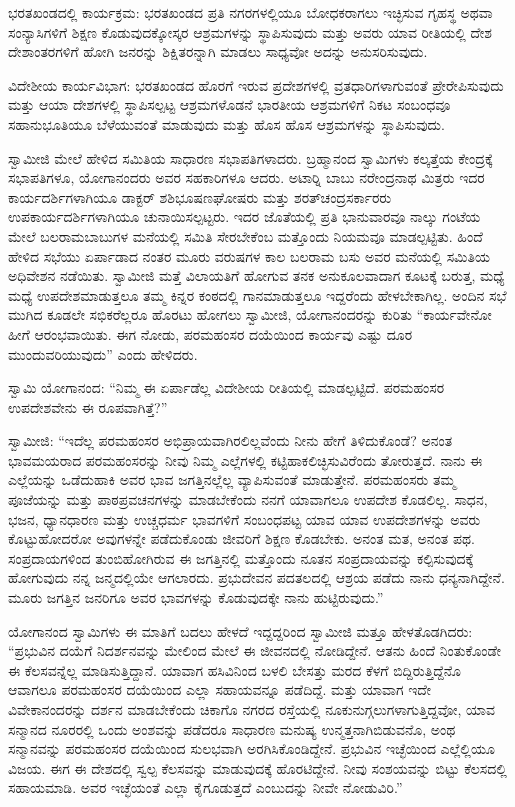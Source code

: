  ಭರತಖಂಡದಲ್ಲಿ ಕಾರ್ಯಕ್ರಮ: ಭರತಖಂಡದ ಪ್ರತಿ ನಗರಗಳಲ್ಲಿಯೂ ಬೋಧಕರಾಗಲು ಇಚ್ಛಿಸುವ ಗೃಹಸ್ಥ ಅಥವಾ ಸಂನ್ಯಾಸಿಗಳಿಗೆ ಶಿಕ್ಷಣ ಕೊಡುವುದಕ್ಕೋಸ್ಕರ ಆಶ್ರಮಗಳನ್ನು ಸ್ಥಾಪಿಸುವುದು ಮತ್ತು ಅವರು ಯಾವ ರೀತಿಯಲ್ಲಿ ದೇಶ ದೇಶಾಂತರಗಳಿಗೆ ಹೋಗಿ ಜನರನ್ನು ಶಿಕ್ಷಿತರನ್ನಾಗಿ ಮಾಡಲು ಸಾಧ್ಯವೋ ಅದನ್ನು ಅನುಸರಿಸುವುದು. 

 ವಿದೇಶೀಯ ಕಾರ್ಯವಿಭಾಗ: ಭರತಖಂಡದ ಹೊರಗೆ ಇರುವ ಪ್ರದೇಶಗಳಲ್ಲಿ ವ್ರತಧಾರಿಗಳಾಗುವಂತೆ ಪ್ರೇರೇಪಿಸುವುದು ಮತ್ತು ಆಯಾ ದೇಶಗಳಲ್ಲಿ ಸ್ಥಾಪಿಸಲ್ಪಟ್ಟ ಆಶ್ರಮಗಳೊಡನೆ ಭಾರತೀಯ ಆಶ್ರಮಗಳಿಗೆ ನಿಕಟ ಸಂಬಂಧವೂ ಸಹಾನುಭೂತಿಯೂ ಬೆಳೆಯುವಂತೆ ಮಾಡುವುದು ಮತ್ತು ಹೊಸ ಹೊಸ ಆಶ್ರಮಗಳನ್ನು ಸ್ಥಾಪಿಸುವುದು. 

 ಸ್ವಾಮೀಜಿ ಮೇಲೆ ಹೇಳಿದ ಸಮಿತಿಯ ಸಾಧಾರಣ ಸಭಾಪತಿಗಳಾದರು. ಬ್ರಹ್ಮಾನಂದ ಸ್ವಾಮಿಗಳು ಕಲ್ಕತ್ತೆಯ ಕೇಂದ್ರಕ್ಕೆ ಸಭಾಪತಿಗಳೂ, ಯೋಗಾನಂದರು ಅವರ ಸಹಕಾರಿಗಳೂ ಆದರು. ಅಟಾರ‍್ನಿ ಬಾಬು ನರೇಂದ್ರನಾಥ ಮಿತ್ರರು ಇದರ ಕಾರ್ಯದರ್ಶಿಗಳಾಗಿಯೂ ಡಾಕ್ಟರ್ ಶಶಿಭೂಷಣಘೋಷರು ಮತ್ತು ಶರತ್‍ಚಂದ್ರಸರ್ಕಾರರು ಉಪಕಾರ್ಯದರ್ಶಿಗಳಾಗಿಯೂ ಚುನಾಯಿಸಲ್ಪಟ್ಟರು. ಇದರ ಜೊತೆಯಲ್ಲಿ ಪ್ರತಿ ಭಾನುವಾರವೂ ನಾಲ್ಕು ಗಂಟೆಯ ಮೇಲೆ ಬಲರಾಮಬಾಬುಗಳ ಮನೆಯಲ್ಲಿ ಸಮಿತಿ ಸೇರಬೇಕೆಂಬ ಮತ್ತೊಂದು ನಿಯಮವೂ ಮಾಡಲ್ಪಟ್ಟಿತು. ಹಿಂದೆ ಹೇಳಿದ ಸಭೆಯು ಏರ್ಪಾಡಾದ ನಂತರ ಮೂರು ವರುಷಗಳ ಕಾಲ ಬಲರಾಮ ಬಸು ಅವರ ಮನೆಯಲ್ಲಿ ಸಮಿತಿಯ ಅಧಿವೇಶನ ನಡೆಯಿತು. ಸ್ವಾಮೀಜಿ ಮತ್ತೆ ವಿಲಾಯತಿಗೆ ಹೋಗುವ ತನಕ ಅನುಕೂಲವಾದಾಗ ಕೂಟಕ್ಕೆ ಬರುತ್ತ, ಮಧ್ಯೆ ಮಧ್ಯೆ ಉಪದೇಶಮಾಡುತ್ತಲೂ ತಮ್ಮ ಕಿನ್ನರ ಕಂಠದಲ್ಲಿ ಗಾನಮಾಡುತ್ತಲೂ ಇದ್ದರೆಂದು ಹೇಳಬೇಕಾಗಿಲ್ಲ. ಅಂದಿನ ಸಭೆ ಮುಗಿದ ಕೂಡಲೇ ಸಭಿಕರೆಲ್ಲರೂ ಹೊರಟು ಹೋಗಲು ಸ್ವಾಮೀಜಿ, ಯೋಗಾನಂದರನ್ನು ಕುರಿತು “ಕಾರ್ಯವೇನೋ ಹೀಗೆ ಆರಂಭವಾಯಿತು. ಈಗ ನೋಡು, ಪರಮಹಂಸರ ದಯೆಯಿಂದ ಕಾರ್ಯವು ಎಷ್ಟು ದೂರ ಮುಂದುವರಿಯುವುದು” ಎಂದು ಹೇಳಿದರು. 

 ಸ್ವಾಮಿ ಯೋಗಾನಂದ: “ನಿಮ್ಮ ಈ ಏರ್ಪಾಡೆಲ್ಲ ವಿದೇಶೀಯ ರೀತಿಯಲ್ಲಿ ಮಾಡಲ್ಪಟ್ಟಿದೆ. ಪರಮಹಂಸರ ಉಪದೇಶವೇನು ಈ ರೂಪವಾಗಿತ್ತೆ?” 

 ಸ್ವಾಮೀಜಿ: “ಇದೆಲ್ಲ ಪರಮಹಂಸರ ಅಭಿಪ್ರಾಯವಾಗಿರಲಿಲ್ಲವೆಂದು ನೀನು ಹೇಗೆ ತಿಳಿದುಕೊಂಡೆ? ಅನಂತ ಭಾವಮಯರಾದ ಪರಮಹಂಸರನ್ನು ನೀವು ನಿಮ್ಮ ಎಲ್ಲೆಗಳಲ್ಲಿ ಕಟ್ಟಿಹಾಕಲಿಚ್ಛಿಸುವಿರೆಂದು ತೋರುತ್ತದೆ. ನಾನು ಈ ಎಲ್ಲೆಯನ್ನು ಒಡೆದುಹಾಕಿ ಅವರ ಭಾವ ಜಗತ್ತಿನಲ್ಲೆಲ್ಲ ವ್ಯಾಪಿಸುವಂತೆ ಮಾಡುತ್ತೇನೆ. ಪರಮಹಂಸರು ತಮ್ಮ ಪೂಜೆಯನ್ನು ಮತ್ತು ಪಾಠಪ್ರವಚನಗಳನ್ನು ಮಾಡಬೇಕೆಂದು ನನಗೆ ಯಾವಾಗಲೂ ಉಪದೇಶ ಕೊಡಲಿಲ್ಲ. ಸಾಧನ, ಭಜನ, ಧ್ಯಾನಧಾರಣ ಮತ್ತು ಉಚ್ಚಧರ್ಮ ಭಾವಗಳಿಗೆ ಸಂಬಂಧಪಟ್ಟ ಯಾವ ಯಾವ ಉಪದೇಶಗಳನ್ನು ಅವರು ಕೊಟ್ಟುಹೋದರೋ ಅವುಗಳನ್ನೇ ಪಡೆದುಕೊಂಡು ಜೀವರಿಗೆ ಶಿಕ್ಷಣ ಕೊಡಬೇಕು. ಅನಂತ ಮತ, ಅನಂತ ಪಥ. ಸಂಪ್ರದಾಯಗಳಿಂದ ತುಂಬಿಹೋಗಿರುವ ಈ ಜಗತ್ತಿನಲ್ಲಿ ಮತ್ತೊಂದು ನೂತನ ಸಂಪ್ರದಾಯವನ್ನು ಕಲ್ಪಿಸುವುದಕ್ಕೆ ಹೋಗುವುದು ನನ್ನ ಜನ್ಮದಲ್ಲಿಯೇ ಆಗಲಾರದು. ಪ್ರಭುದೇವನ ಪದತಲದಲ್ಲಿ ಆಶ್ರಯ ಪಡೆದು ನಾನು ಧನ್ಯನಾಗಿದ್ದೇನೆ. ಮೂರು ಜಗತ್ತಿನ ಜನರಿಗೂ ಅವರ ಭಾವಗಳನ್ನು ಕೊಡುವುದಕ್ಕೇ ನಾನು ಹುಟ್ಟಿರುವುದು.” 

\newpage

 ಯೋಗಾನಂದ ಸ್ವಾಮಿಗಳು ಈ ಮಾತಿಗೆ ಬದಲು ಹೇಳದೆ ಇದ್ದದ್ದರಿಂದ ಸ್ವಾಮೀಜಿ ಮತ್ತೂ ಹೇಳತೊಡಗಿದರು: “ಪ್ರಭುವಿನ ದಯೆಗೆ ನಿದರ್ಶನವನ್ನು ಮೇಲಿಂದ ಮೇಲೆ ಈ ಜೀವನದಲ್ಲಿ ನೋಡಿದ್ದೇನೆ. ಆತನು ಹಿಂದೆ ನಿಂತುಕೊಂಡೇ ಈ ಕೆಲಸವನ್ನೆಲ್ಲ ಮಾಡಿಸುತ್ತಿದ್ದಾನೆ. ಯಾವಾಗ ಹಸಿವಿನಿಂದ ಬಳಲಿ ಬೇಸತ್ತು ಮರದ ಕೆಳಗೆ ಬಿದ್ದಿರುತ್ತಿದ್ದೆನೊ ಆವಾಗಲೂ ಪರಮಹಂಸರ ದಯೆಯಿಂದ ಎಲ್ಲಾ ಸಹಾಯವನ್ನೂ ಪಡೆದಿದ್ದೆ. ಮತ್ತು ಯಾವಾಗ ಇದೇ ವಿವೇಕಾನಂದರನ್ನು ದರ್ಶನ ಮಾಡಬೇಕೆಂದು ಚಿಕಾಗೊ ನಗರದ ರಸ್ತೆಯಲ್ಲಿ ನೂಕುನುಗ್ಗಲುಗಳಾಗುತ್ತಿದ್ದವೋ, ಯಾವ ಸನ್ಮಾನದ ನೂರರಲ್ಲಿ ಒಂದು ಅಂಶವನ್ನು ಪಡೆದರೂ ಸಾಧಾರಣ ಮನುಷ್ಯ ಉನ್ಮತ್ತನಾಗಿಬಿಡುವನೊ, ಅಂಥ ಸನ್ಮಾನವನ್ನು ಪರಮಹಂಸರ ದಯೆಯಿಂದ ಸುಲಭವಾಗಿ ಅರಗಿಸಿಕೊಂಡಿದ್ದೇನೆ. ಪ್ರಭುವಿನ ಇಚ್ಛೆಯಿಂದ ಎಲ್ಲೆಲ್ಲಿಯೂ ವಿಜಯ. ಈಗ ಈ ದೇಶದಲ್ಲಿ ಸ್ವಲ್ಪ ಕೆಲಸವನ್ನು ಮಾಡುವುದಕ್ಕೆ ಹೊರಟಿದ್ದೇನೆ. ನೀವು ಸಂಶಯವನ್ನು ಬಿಟ್ಟು ಕೆಲಸದಲ್ಲಿ ಸಹಾಯಮಾಡಿ. ಅವರ ಇಚ್ಛೆಯಂತೆ ಎಲ್ಲಾ ಕೈಗೂಡುತ್ತದೆ ಎಂಬುದನ್ನು ನೀವೇ ನೋಡುವಿರಿ.” 

